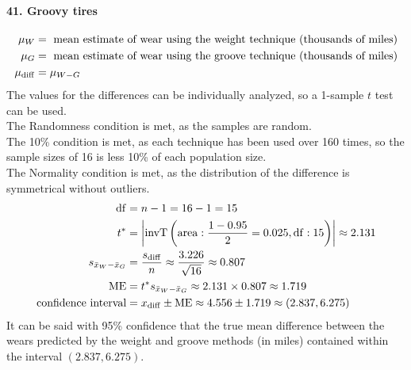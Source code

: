 \documentclass[../Homework]{subfiles}
\begin{document}
			\paragraph{41. Groovy tires}
				\begin{align*}
					\mu_W &= \text{ mean estimate of wear using the weight technique (thousands of miles)} \\
					\mu_G &= \text{ mean estimate of wear using the groove technique (thousands of miles)} \\
					\mu_{\mathrm{diff}} &= \mu_{W - G}
				\end{align*}
				The values for the differences can be individually analyzed, so a 1-sample $t$ test can be used. \\
				The Randomness condition is met, as the samples are random. \\
				The 10\% condition is met, as each technique has been used over 160 times, so the sample sizes of 16 is less 10\% of each population size. \\
				The Normality condition is met, as the distribution of the difference is symmetrical without outliers.
				\begin{align*}
					\operatorname{df} &= n - 1 = 16 - 1 = 15 \\
					t^* &= \left|\operatorname{invT}\left(\operatorname{area}: \frac{1 - 0.95}{2} = 0.025, \operatorname{df}: 15\right)\right| \approx 2.131 \\
					s_{\bar{x}_W - \bar{x}_G} &= \frac{s_{\mathrm{diff}}}{n} \approx \frac{3.226}{\sqrt{16}} \approx 0.807 \\
					\operatorname{ME} &= t^*s_{\bar{x}_W - \bar{x}_G} \approx 2.131 \times 0.807 \approx 1.719 \\
					\text{confidence interval} &= x_{\mathrm{diff}} \pm \operatorname{ME} \approx 4.556 \pm 1.719 \approx (2.837, 6.275)
				\end{align*}
				It can be said with 95\% confidence that the true mean difference between the wears predicted by the weight and groove methods (in miles) contained within the interval $(2.837, 6.275)$.
\end{document}
